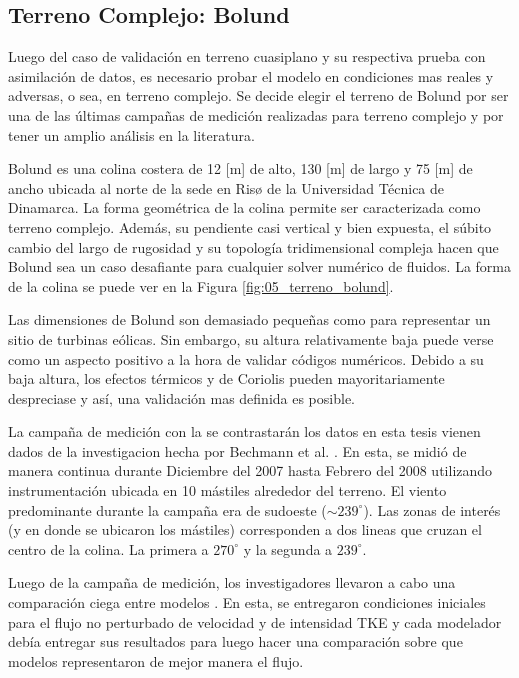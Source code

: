 \subsection{Terreno Complejo: Bolund}
Luego del caso de validación en terreno cuasiplano y su respectiva prueba con asimilación de datos, es necesario probar el modelo en condiciones mas reales y adversas, o sea, en terreno complejo. Se decide elegir el terreno de Bolund por ser una de las últimas campañas de medición realizadas para terreno complejo y por tener un amplio análisis en la literatura.

Bolund es una colina costera de 12 [m] de alto, 130 [m] de largo y 75 [m] de ancho ubicada al norte de la sede en Risø de la Universidad Técnica de Dinamarca. La forma geométrica de la colina permite ser caracterizada como terreno complejo. Además, su pendiente casi vertical y bien expuesta, el súbito cambio del largo de rugosidad y su topología tridimensional compleja hacen que Bolund sea un caso desafiante para cualquier solver numérico de fluidos. La forma de la colina se puede ver en la Figura \ref{fig:05_terreno_bolund}.

Las dimensiones de Bolund son demasiado pequeñas como para representar un sitio de turbinas eólicas. Sin embargo, su altura relativamente baja puede verse como un aspecto positivo a la hora de validar códigos numéricos. Debido a su baja altura, los efectos térmicos y de Coriolis pueden mayoritariamente despreciase y así, una validación mas definida es posible.

La campaña de medición con la se contrastarán los datos en esta tesis vienen dados de la investigacion hecha por Bechmann et al. \cite{3d4285ac04444eb3b9775baf9af052c6}. En esta, se midió de manera continua durante Diciembre del 2007 hasta Febrero del 2008 utilizando instrumentación ubicada en 10 mástiles alrededor del terreno.  El viento predominante durante la campaña era de sudoeste ($\sim\!239^\circ$). Las zonas de interés (y en donde se ubicaron los mástiles) corresponden a dos lineas que cruzan el centro de la colina. La primera a $270^\circ$ y la segunda a $239^\circ$.

Luego de la campaña de medición, los investigadores llevaron a cabo una comparación ciega entre modelos \cite{Bechmann2011}. En esta, se entregaron condiciones iniciales para el flujo no perturbado de velocidad y de intensidad TKE y cada modelador debía entregar sus resultados para luego hacer una comparación sobre que modelos representaron de mejor manera el flujo.

